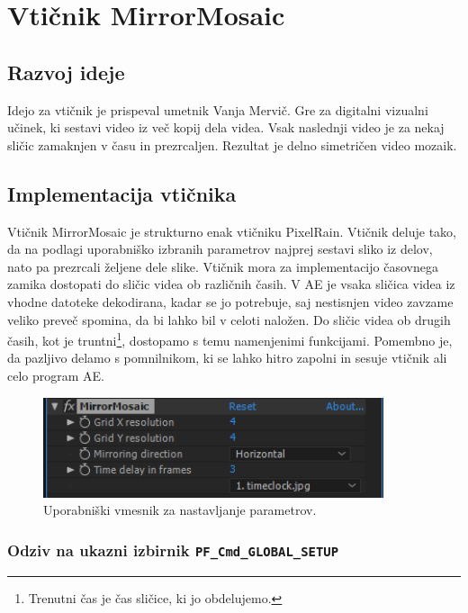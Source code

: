 \documentclass[a4paper, 12pt]{book}
\begin{document}

\section{Vtičnik MirrorMosaic}

\subsection{Razvoj ideje}

Idejo za vtičnik je prispeval umetnik Vanja Mervič.
Gre za digitalni vizualni učinek, ki sestavi video iz več kopij dela videa.
Vsak naslednji video je za nekaj sličic zamaknjen v času in prezrcaljen.
Rezultat je delno simetričen video mozaik.

\subsection{Implementacija vtičnika}

Vtičnik MirrorMosaic je strukturno enak vtičniku PixelRain.
Vtičnik deluje tako, da na podlagi uporabniško izbranih parametrov najprej sestavi sliko iz delov, nato pa prezrcali željene dele slike.
Vtičnik mora za implementacijo časovnega zamika dostopati do sličic videa ob različnih časih.
V AE je vsaka sličica videa iz vhodne datoteke dekodirana, kadar se jo potrebuje, saj nestisnjen video zavzame veliko preveč spomina, da bi lahko bil v celoti naložen.
Do sličic videa ob drugih časih, kot je truntni\footnote{Trenutni čas je čas sličice, ki jo obdelujemo.}, dostopamo s temu namenjenimi funkcijami. 
Pomembno je, da pazljivo delamo s pomnilnikom, ki se lahko hitro zapolni in sesuje vtičnik ali celo program AE.

\begin{figure}[t]
\begin{center}
\includegraphics[width=10cm]{img/mirrormosaicUI.png}
\end{center}
\caption{Uporabniški vmesnik za nastavljanje parametrov.}
\label{ui3}
\end{figure}

\subsubsection{Odziv na ukazni izbirnik \texttt{PF\_Cmd\_GLOBAL\_SETUP}}
\end{document}
